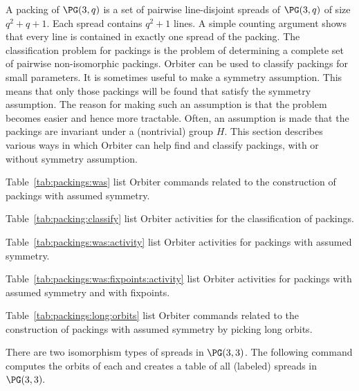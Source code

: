 A packing of $\PG(3,q)$ 
is a set of pairwise line-disjoint spreads of $\PG(3,q)$ of size $q^2+q+1.$ 
Each spread contains $q^2+1$ lines. 
A simple counting argument shows that 
every line is contained in exactly one spread of the packing.
The classification problem for packings 
is the problem of determining a complete set of pairwise non-isomorphic 
packings. 
Orbiter can be used to classify packings for small parameters. 
It is sometimes useful to make a symmetry assumption.
This means that only those packings will be found that satisfy the symmetry assumption. 
The reason for making such an assumption is that the problem becomes easier and hence more tractable.
Often, an assumption is made that the packings are invariant under a (nontrivial) group $H$.
This section describes various ways in which Orbiter can help find and classify packings, 
with or without symmetry assumption.

\bigskip


Table~\ref{tab:packings:was} list Orbiter commands related 
to the construction of packings with assumed symmetry.


\bigskip

Table~\ref{tab:packing:classify} list Orbiter activities for the classification of packings.



\bigskip

Table~\ref{tab:packings:was:activity} list Orbiter activities for packings with assumed symmetry.


\bigskip

Table~\ref{tab:packings:was:fixpoints:activity} list Orbiter activities for packings with assumed symmetry and with fixpoints.

\bigskip

Table~\ref{tab:packings:long:orbits} list Orbiter commands related to the construction 
of packings with assumed symmetry by picking long orbits.


\bigskip



There are two isomorphism types of spreads in $\PG(3,3)$. 
The following command computes the orbits of each and 
creates a table of all (labeled) spreads in $\PG(3,3).$ 




